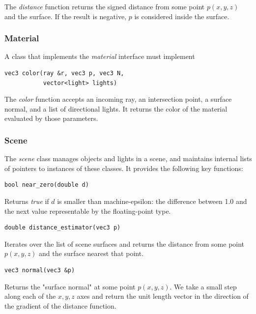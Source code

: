 \documentclass[sigconf, nonacm]{acmart}
\begin{document}
The \textit{distance} function returns the signed distance from some point $p(x,y,z)$ and the surface. If the result is negative, $p$ is considered inside the surface. 

\subsubsection{Material}

A class that implements the \textit{material} interface must implement

\begin{lstlisting}
vec3 color(ray &r, vec3 p, vec3 N,
           vector<light> lights)
\end{lstlisting}

The \textit{color} function accepts an incoming ray, an intersection point, a surface normal, and a list of directional lights. It returns the color of the material evaluated by those parameters.

\subsubsection{Scene}

The \textit{scene} class manages objects and lights in a scene, and maintains internal lists of pointers to instances of these classes. It provides the following key functions:

\begin{lstlisting}
bool near_zero(double d)
\end{lstlisting}

Returns \textit{true} if $d$ is smaller than machine-epsilon: the difference between 1.0 and the next value representable by the floating-point type.

\begin{lstlisting}
double distance_estimator(vec3 p)
\end{lstlisting}

Iterates over the list of scene surfaces and returns the distance from some point $p(x,y,z)$ and the surface nearest that point.

\begin{lstlisting}
vec3 normal(vec3 &p)
\end{lstlisting}

Returns the "surface normal" at some point $p(x,y,z)$. We take a small step along each of the $x, y, z$ axes and return the unit length vector in the direction of the gradient of the distance function.
\end{document}
